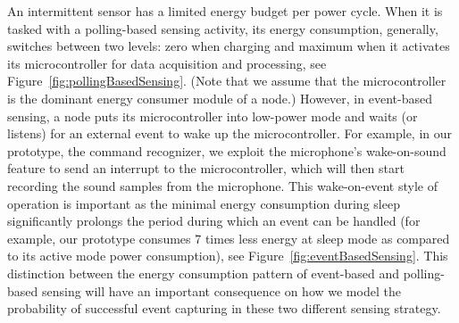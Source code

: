 %
An intermittent sensor has a limited energy budget per power cycle. When it is tasked with a polling-based sensing activity, its energy consumption, generally, switches between two levels: zero when charging and maximum when it activates its microcontroller for data acquisition and processing, see Figure~\ref{fig:pollingBasedSensing}. (Note that we assume that the microcontroller is the dominant energy consumer module of a node.) However, in event-based sensing, a node puts its microcontroller into low-power mode and waits (or listens) for an external event to wake up the microcontroller. For example, in our prototype, the command recognizer, we exploit the microphone's wake-on-sound feature to send an interrupt to the microcontroller, which will then start recording the sound samples from the microphone. 
%
%
This wake-on-event style of operation is important as the minimal energy consumption during sleep significantly prolongs the period during which an event can be handled (for example, our prototype consumes 7 times less energy at sleep mode as compared to its active mode power consumption), see Figure~\ref{fig:eventBasedSensing}.
This distinction between the energy consumption pattern of event-based and polling-based sensing will have an important consequence on how we model the probability of successful event capturing in these two different sensing strategy. 
%

